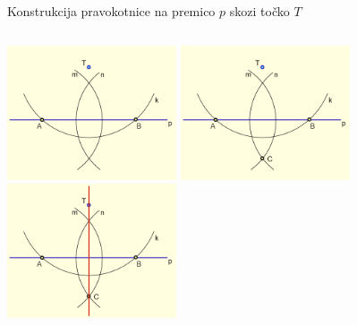 \begin{frame}{Konstrukcija pravokotnice na premico $p$ skozi točko $T$}
\begin{columns}
\begin{column}{0.45\textwidth}
			\includegraphics[width=50mm]{slike/fig-5.png}%
			\includegraphics[width=50mm]{slike/fig-6.png}%
			\includegraphics[width=50mm]{slike/fig-7.png}%
		\end{column}
	\end{columns}
\end{frame}

